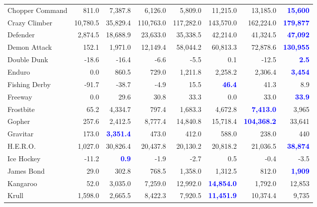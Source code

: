 \documentclass{article}
\begin{document}
\begin{figure}
\begin{tabular}{ l | r|r|r|r|r|r| r }
  Chopper Command  &   811.0  &   7,387.8  &   6,126.0  &   5,809.0  &   11,215.0  &   13,185.0  &  \textbf{\textcolor{blue}{15,600}}\\
  Crazy Climber  &   10,780.5  &   35,829.4  &   110,763.0  &   117,282.0  &   143,570.0  &   162,224.0  &  \textbf{\textcolor{blue}{179,877}}\\
  Defender  &   2,874.5  &   18,688.9  &   23,633.0  &   35,338.5  &   42,214.0  &   41,324.5  &  \textbf{\textcolor{blue}{47,092}}\\
  Demon Attack  &   152.1  &   1,971.0  &   12,149.4  &   58,044.2  &   60,813.3  &   72,878.6  &  \textbf{\textcolor{blue}{130,955}}\\
  Double Dunk  &   -18.6  &   -16.4  &   -6.6  &   -5.5  &   0.1  &   -12.5  &  \textbf{\textcolor{blue}{2.5}}\\
  Enduro  &   0.0  &   860.5  &   729.0  &   1,211.8  &   2,258.2  &   2,306.4  &  \textbf{\textcolor{blue}{3,454}}\\
  Fishing Derby  &   -91.7  &   -38.7  &   -4.9  &   15.5  &  \textbf{\textcolor{blue}{ 46.4}}  &   41.3  &  8.9\\
  Freeway  &   0.0  &   29.6  &   30.8  &   33.3  &   0.0  &   33.0  &  \textbf{\textcolor{blue}{33.9}}\\
  Frostbite  &   65.2  &   4,334.7  &   797.4  &   1,683.3  &   4,672.8  &  \textbf{\textcolor{blue}{ 7,413.0}}  &  3,965\\
  Gopher  &   257.6  &   2,412.5  &   8,777.4  &   14,840.8  &   15,718.4  &  \textbf{\textcolor{blue}{ 104,368.2}}  &  33,641\\
  Gravitar  &   173.0  &  \textbf{\textcolor{blue}{ 3,351.4}}  &   473.0  &   412.0  &   588.0  &   238.0  &  440\\
  H.E.R.O.  &   1,027.0  &   30,826.4  &   20,437.8  &   20,130.2  &   20,818.2  &   21,036.5  &  \textbf{\textcolor{blue}{38,874}}\\
  Ice Hockey  &   -11.2  &  \textbf{\textcolor{blue}{ 0.9}}  &   -1.9  &   -2.7  &   0.5  &   -0.4  &  -3.5\\
  James Bond  &   29.0  &   302.8  &   768.5  &   1,358.0  &   1,312.5  &   812.0  &  \textbf{\textcolor{blue}{1,909}}\\
  Kangaroo  &   52.0  &   3,035.0  &   7,259.0  &   12,992.0  &  \textbf{\textcolor{blue}{ 14,854.0}}  &   1,792.0  &  12,853\\
  Krull  &   1,598.0  &   2,665.5  &   8,422.3  &   7,920.5  &  \textbf{\textcolor{blue}{ 11,451.9}}  &   10,374.4  &  9,735\\

\end{tabular}
\end{figure}
\end{document}
